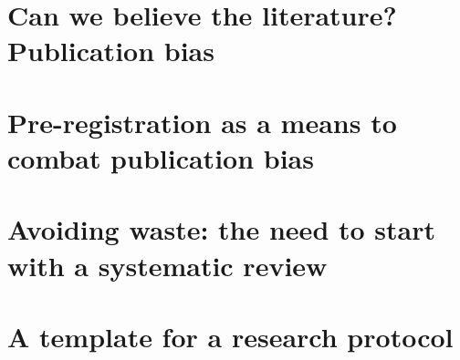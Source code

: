\documentclass[]{book}
\begin{document}
\hypertarget{can-we-believe-the-literature-publication-bias}{%
\chapter{Can we believe the literature? Publication bias}\label{can-we-believe-the-literature-publication-bias}}

\hypertarget{pre-registration-as-a-means-to-combat-publication-bias}{%
\chapter{Pre-registration as a means to combat publication bias}\label{pre-registration-as-a-means-to-combat-publication-bias}}

\hypertarget{avoiding-waste-the-need-to-start-with-a-systematic-review}{%
\chapter{Avoiding waste: the need to start with a systematic review}\label{avoiding-waste-the-need-to-start-with-a-systematic-review}}

\hypertarget{a-template-for-a-research-protocol}{%
\chapter{A template for a research protocol}\label{a-template-for-a-research-protocol}}


\end{document}
